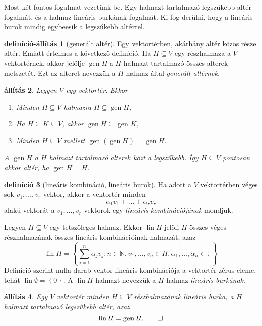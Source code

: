 \documentclass[9pt, showtrims]{memoir}
\theoremstyle{plain}
\newtheorem{proposition}{állítás}[section]
\theoremstyle{remark}
\theoremstyle{definition}
\newtheorem{definition}[proposition]{definíció}
\newtheorem{defprop}[proposition]{definíció-állítás}
\renewcommand{\mathbf}{\mathbb}
\DeclareMathOperator{\lin}{lin}
\DeclareMathOperator{\gen}{gen}
\begin{document}
Most két fontos fogalmat vezetünk be.
Egy halmazt tartalmazó legszűkebb altér fogalmát,
és a halmaz lineáris burkának fogalmát. 
Ki fog derülni, hogy a lineáris burok mindig egybeesik a legszúkebb altérrel.
\begin{defprop}[generált altér]
    Egy vektortérben, akárhány altér közös része altér.
    Emiatt értelmes a következő definíció.
    Ha $H\subseteq V$ egy részhalmaza a $V$ vektortérnek,
    akkor jelölje 
    $\gen H$ a $H$ halmazt tartalmazó összes alterek metszetét.
    Ezt az alteret nevezzük a $H$ halmaz által \emph{generált altérnek.}
\end{defprop}
\begin{proposition}
    Legyen $V$ egy vektortér.
    Ekkor
    \begin{enumerate}
        \item Minden $H\subseteq V$ halmazra $H\subseteq \gen H$,
        \item Ha $H\subseteq K\subseteq V$, akkor $\gen H\subseteq \gen K$,
        \item Minden $H\subseteq V$ mellett $\gen\left( \gen H \right)=\gen H$.
    \end{enumerate}
    A $\gen H$ a $H$ halmazt tartalmazó alterek közt a legszűkebb.
    Így $H\subseteq V$ pontosan akkor altér, ha $\gen H=H$.
\end{proposition}
\begin{definition}[lineáris kombináció, lineáris burok]
    Ha adott a $V$ vektortérben véges sok $v_1,\dots,v_r$ vektor,
    akkor a vektortér minden
    \[
        \alpha_1v_1+\dots+\alpha_r v_r
    \]
    alakú vektorát a $v_1,\dots,v_r$ vektorok egy \emph{lineáris kombinációjának} mondjuk.

    Legyen $H\subseteq V$ egy tetszőleges halmaz.
    Ekkor $\lin H$ jelöli $H$ összes véges részhalmazának összes lineáris kombinációinak halmazát,
    azaz
    \[
        \lin H=
        \left\{ \sum_{j=1}^n\alpha_jv_j:n\in\mathbf{N},v_1,\dots,v_n\in H,\alpha_1,\dots,\alpha_n\in\mathbf{F} \right\}
    \]
    Definíció szerint nulla darab vektor lineáris kombinációja a vektortér zérus eleme, 
    tehát $\lin \emptyset=\left\{ 0 \right\}.$
    A $\lin H$ halmazt nevezzük a $H$ halmaz \emph{lineáris burkának}.
\end{definition}
\begin{proposition}
    Egy $V$ vektortér minden $H\subseteq V$ részhalmazának lineáris burka, 
    a $H$ halmazt tartalmazó legszűkebb altér, azaz
    \[
        \lin H=\gen H.\qedhere
    \]
\end{proposition}
\end{document}
